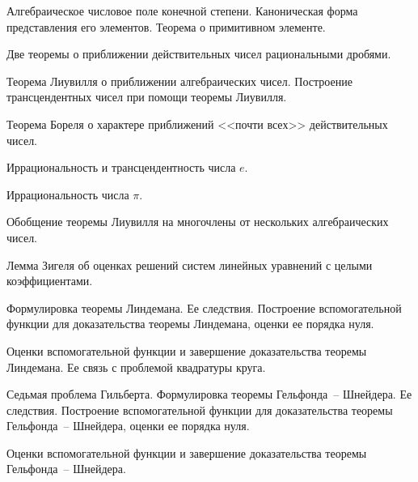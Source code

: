 \documentclass[a4paper,draft]{article}
\begin{document}
\begin{nums}{0}
\item Алгебраическое числовое поле конечной степени. Каноническая
форма представления его элементов. Теорема о примитивном элементе.

\item Две теоремы о приближении действительных чисел рациональными
дробями.

\item Теорема Лиувилля о приближении алгебраических чисел.
Построение трансцендентных чисел при помощи теоремы Лиувилля.

\item Теорема Бореля о характере приближений <<почти всех>> действительных чисел.

\item Иррациональность и трансцендентность числа   $e$.

\item Иррациональность  числа   $\pi$.

\item Обобщение теоремы Лиувилля на многочлены от нескольких
алгебраических чисел.

\item Лемма Зигеля об оценках решений систем линейных уравнений с
целыми коэффициентами.

\item Формулировка теоремы Линдемана. Ее следствия. Построение
вспомогательной функции для доказательства теоремы Линдемана, оценки ее порядка нуля.

\item Оценки вспомогательной функции и завершение доказательства
теоремы Линдемана. Ее связь с проблемой квадратуры круга.

\item Седьмая проблема Гильберта. Формулировка теоремы
Гельфонда~-- Шнейдера. Ее следствия. Построение
вспомогательной функции для доказательства теоремы
Гельфонда~-- Шнейдера, оценки ее порядка нуля.

\item Оценки вспомогательной функции и завершение доказательства
теоремы Гельфонда~-- Шнейдера.
\end{nums}

\medskip
\dmvntrail
\end{document}
